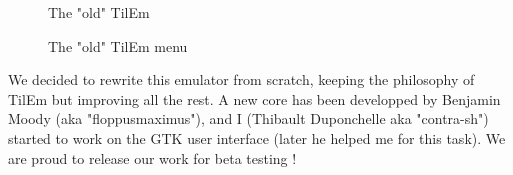 \documentclass[10pt]{report}
\begin{document}
\begin{figure}[H]
\centering
{}
\caption{The "old" TilEm}
\end{figure}

\begin{figure}[H]
\centering
{}
\caption{The "old" TilEm menu}
\end{figure}

We decided to rewrite this emulator from scratch, keeping the philosophy of TilEm but improving all the rest.\newline
A new core has been developped by Benjamin Moody (aka "floppusmaximus"), and I (Thibault Duponchelle aka "contra-sh") started to work on the GTK user interface (later he helped me for this task).\newline\newline
We are proud to release our work for beta testing !
\end{document}
